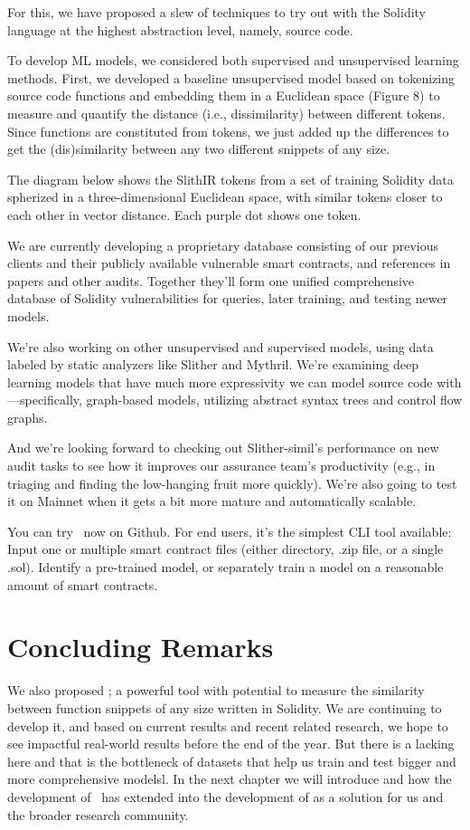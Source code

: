 For this, we have proposed a slew of techniques to try out with the Solidity language at the highest abstraction level, namely, source code.

To develop ML models, we considered both supervised and unsupervised learning methods.
First, we developed a baseline unsupervised model based on tokenizing source code functions and embedding them in a Euclidean space
(Figure 8) to measure and quantify the distance (i.e., dissimilarity) between different tokens.
Since functions are constituted from tokens, we just added up the differences to get the (dis)similarity between any two different snippets of any size.

The diagram below shows the SlithIR tokens from a set of training Solidity data spherized in a three-dimensional Euclidean space, with similar tokens closer to each other in vector distance.
Each purple dot shows one token.

We are currently developing a proprietary database consisting of our previous clients and their publicly available vulnerable smart contracts, and references in papers and other audits.
Together they'll form one unified comprehensive database of Solidity vulnerabilities for queries, later training, and testing newer models.

We're also working on other unsupervised and supervised models, using data labeled by static analyzers like Slither and Mythril.
We're examining deep learning models that have much more expressivity we can model source code with—specifically, graph-based models, utilizing abstract syntax trees and control flow graphs.

And we're looking forward to checking out Slither-simil's performance on new audit tasks to see how
it improves our assurance team's productivity (e.g., in triaging and finding the low-hanging fruit more quickly).
We're also going to test it on Mainnet when it gets a bit more mature and automatically scalable.

You can try \slithersimil~now on Github.
For end users, it's the simplest CLI tool available:
Input one or multiple smart contract files (either directory, .zip file, or a single .sol).
Identify a pre-trained model, or separately train a model on a reasonable amount of smart contracts.

\section{Concluding Remarks}

We also proposed \slithersimil; a powerful tool with potential to measure the similarity between function snippets of any size written in Solidity.
We are continuing to develop it, and based on current results and recent related research, we hope to see impactful real-world results before the end of the year.
But there is a lacking here and that is the bottleneck of datasets that help us train and test bigger and more comprehensive modelsl.
In the next chapter we will introduce \etherbase and how the development of \slithersimil~has extended into the development of \etherbase as a solution for us and the broader research community.